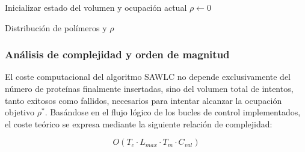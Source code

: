 \begin{algorithm}[H]
    \caption{Inserción de proteínas solubles mediante SAWLC}
    \label{alg:sawlc_tecnico}

    Inicializar estado del volumen y ocupación actual $\rho \gets 0$\;

    \Return Distribución de polímeros y $\rho$\;
\end{algorithm}

\subsubsection{Análisis de complejidad y orden de magnitud}

El coste computacional del algoritmo SAWLC no depende exclusivamente del número de proteínas finalmente insertadas, sino del volumen total de intentos, tanto exitosos como fallidos, necesarios para intentar alcanzar la ocupación objetivo $\rho^*$. Basándose en el flujo lógico de los bucles de control implementados, el coste teórico se expresa mediante la siguiente relación de complejidad:

\[
O(T_c \cdot L_{max} \cdot T_m \cdot C_{val})
\]

